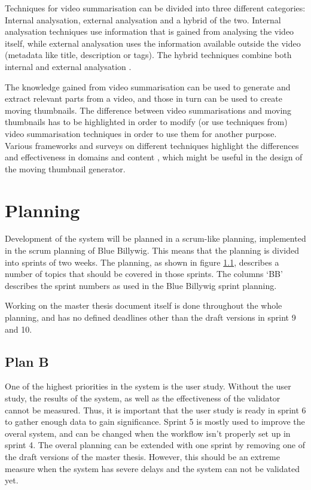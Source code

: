 \documentclass{../resources/acm_proc_article-sp}
\begin{document}
Techniques for video summarisation can be divided into three different categories: Internal analysation, external analysation and a hybrid of the two. Internal analysation techniques use information that is gained from analysing the video itself, while external analysation uses the information available outside the video (metadata like title, description or tags). The hybrid techniques combine both internal and external analysation \cite{Money:2008fn}.

The knowledge gained from video summarisation can be used to generate and extract relevant parts from a video, and those in turn can be used to create moving thumbnails. The difference between video summarisations and moving thumbnails has to be highlighted in order to modify (or use techniques from) video summarisation techniques in order to use them for another purpose. Various frameworks and surveys on different techniques highlight the differences and effectiveness in domains and content \cite{Money:2008fn,Ajmal:2012hi}, which might be useful in the design of the moving thumbnail generator.

\section{Planning}

Development of the system will be planned in a scrum-like planning, implemented in the scrum planning of Blue Billywig. This means that the planning is divided into sprints of two weeks. The planning, as shown in figure \ref{}, describes a number of topics that should be covered in those sprints. The columns `BB' describes the sprint numbers as used in the Blue Billywig sprint planning.

Working on the master thesis document itself is done throughout the whole planning, and has no defined deadlines other than the draft versions in sprint 9 and 10. 

\subsection{Plan B}

One of the highest priorities in the system is the user study. Without the user study, the results of the system, as well as the effectiveness of the validator cannot be measured. Thus, it is important that the user study is ready in sprint 6 to gather enough data to gain significance. Sprint 5 is mostly used to improve the overal system, and can be changed when the workflow isn't properly set up in sprint 4. The overal planning can be extended with one sprint by removing one of the draft versions of the master thesis. However, this should be an extreme measure when the system has severe delays and the system can not be validated yet.
\end{document}
